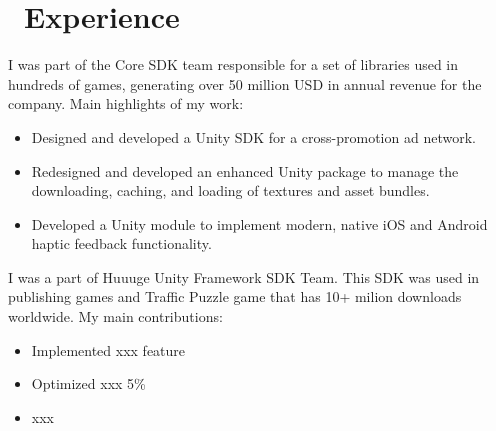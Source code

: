\documentclass{resume}
\begin{document}




\section{\faUsers\ Experience}
I was part of the Core SDK team responsible for a set of libraries used in hundreds of games, generating over 50 million USD in annual revenue for the company.
Main highlights of my work:
\begin{itemize}
    \item Designed and developed a Unity SDK for a cross-promotion ad network.
    \item Redesigned and developed an enhanced Unity package to manage the downloading, caching, and loading of textures and asset bundles.
    \item Developed a Unity module to implement modern, native iOS and Android haptic feedback functionality.
\end{itemize}

I was a part of Huuuge Unity Framework SDK Team. This SDK was used in publishing games and Traffic Puzzle game that has 10+ milion downloads worldwide.
My main contributions:
\begin{itemize}
  \item Implemented xxx feature
  \item Optimized xxx 5\%
  \item xxx
\end{itemize}
\end{document}
